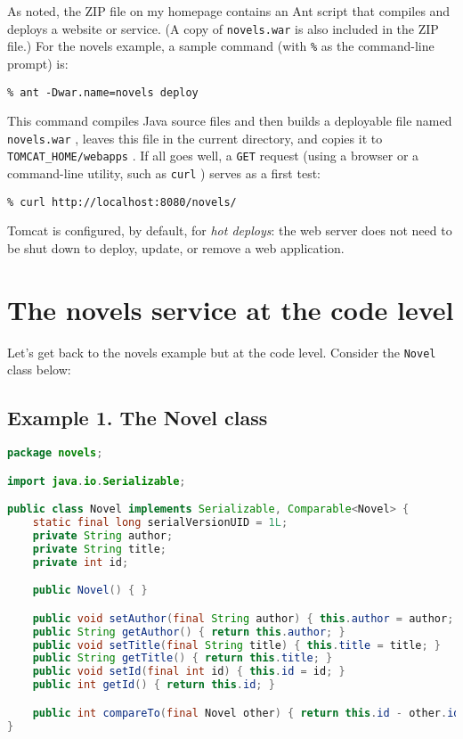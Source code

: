 \documentclass[12pt]{article}
\begin{document}
As noted, the ZIP file on my homepage contains an Ant script that compiles and deploys a website or service. (A copy of \verb|novels.war| is also included in the ZIP file.) For the novels example, a sample command (with \verb|%| as the command-line prompt) is:\\

\begin{lstlisting}
% ant -Dwar.name=novels deploy

\end{lstlisting}

This command compiles Java source files and then builds a deployable file named \verb|novels.war| , leaves this file in the current directory, and copies it to \verb|TOMCAT_HOME/webapps| . If all goes well, a \verb|GET| request (using a browser or a command-line utility, such as \verb|curl| ) serves as a first test:\\

\begin{lstlisting}
% curl http://localhost:8080/novels/

\end{lstlisting}

Tomcat is configured, by default, for \textit{hot deploys}: the web server does not need to be shut down to deploy, update, or remove a web application.

\section{The novels service at the code level}

Let's get back to the novels example but at the code level. Consider the \verb|Novel| class below:\\

\subsection{Example 1. The Novel class}

\newpage

\begin{lstlisting}[language=java]
package novels;

import java.io.Serializable;

public class Novel implements Serializable, Comparable<Novel> {
    static final long serialVersionUID = 1L;
    private String author;
    private String title;
    private int id;

    public Novel() { }

    public void setAuthor(final String author) { this.author = author; }
    public String getAuthor() { return this.author; }
    public void setTitle(final String title) { this.title = title; }
    public String getTitle() { return this.title; }
    public void setId(final int id) { this.id = id; }
    public int getId() { return this.id; }

    public int compareTo(final Novel other) { return this.id - other.id; }
}

\end{lstlisting}
\end{document}
